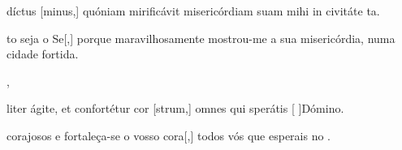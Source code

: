 {  %
  {\item {}díctus [minus,] quóniam mirificávit misericórdiam suam mihi in civitáte ta.~\Antiphona}%
    {\item {}to seja o Se[,] porque maravilhosamente mos\-trou-me a sua misericórdia, numa cidade fortida.~\Antiphona},
  {\item {}liter ágite, et confortétur cor [strum,] omnes qui sperátis [ ]{Dó}mino.~\Antiphona}
    {\item {} corajosos e fortaleça-se o vosso cora[,] todos vós que esperais no .~\Antiphona}
}